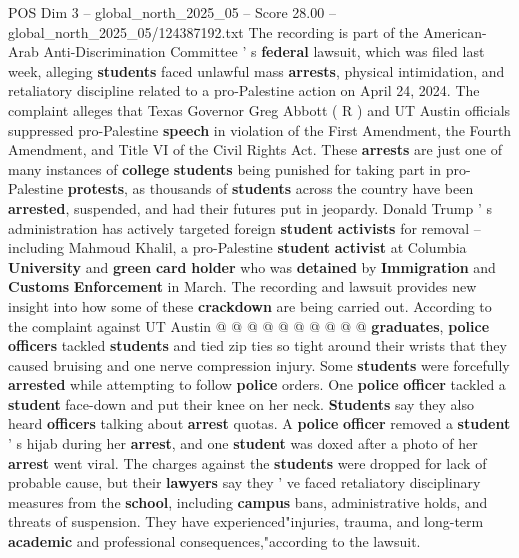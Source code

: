 \begin{textsample}{POS Dim 3 – global\_north\_2025\_05 – Score 28.00 – global\_north\_2025\_05/124387192.txt}  \label{ex:f3_pos_143}
The recording is part of the American-Arab Anti-Discrimination Committee ' s \textbf{federal} lawsuit, which was filed last week, alleging \textbf{students} faced unlawful mass \textbf{arrests}, physical intimidation, and retaliatory discipline related to a pro-Palestine action on April 24, 2024.
The complaint alleges that Texas Governor Greg Abbott ( R ) and UT Austin officials suppressed pro-Palestine \textbf{speech} in violation of the First Amendment, the Fourth Amendment, and Title VI of the Civil Rights Act.
These \textbf{arrests} are just one of many instances of \textbf{college} \textbf{students} being punished for taking part in pro-Palestine \textbf{protests}, as thousands of \textbf{students} across the country have been \textbf{arrested}, suspended, and had their futures put in jeopardy.
Donald Trump ' s administration has actively targeted foreign \textbf{student} \textbf{activists} for removal -- including Mahmoud Khalil, a pro-Palestine \textbf{student} \textbf{activist} at Columbia \textbf{University} and \textbf{green} \textbf{card} \textbf{holder} who was \textbf{detained} by \textbf{Immigration} and \textbf{Customs} \textbf{Enforcement} in March.
The recording and lawsuit provides new insight into how some of these \textbf{crackdown} are being carried out.
According to the complaint against UT Austin @ @ @ @ @ @ @ @ @ @ \textbf{graduates}, \textbf{police} \textbf{officers} tackled \textbf{students} and tied zip ties so tight around their wrists that they caused bruising and one nerve compression injury.
Some \textbf{students} were forcefully \textbf{arrested} while attempting to follow \textbf{police} orders.
One \textbf{police} \textbf{officer} tackled a \textbf{student} face-down and put their knee on her neck. \textbf{Students} say they also heard \textbf{officers} talking about \textbf{arrest} quotas.
A \textbf{police} \textbf{officer} removed a \textbf{student} ' s hijab during her \textbf{arrest}, and one \textbf{student} was doxed after a photo of her \textbf{arrest} went viral.
The charges against the \textbf{students} were dropped for lack of probable cause, but their \textbf{lawyers} say they ' ve faced retaliatory disciplinary measures from the \textbf{school}, including \textbf{campus} bans, administrative holds, and threats of suspension.
They have experienced"injuries, trauma, and long-term \textbf{academic} and professional consequences,"according to the lawsuit.

\end{textsample}
